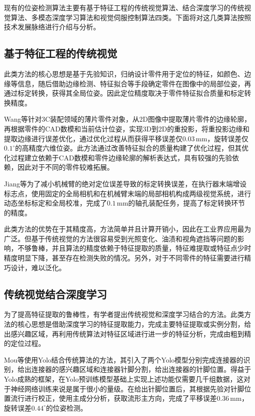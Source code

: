\documentclass{Diploma}
\begin{document}
现有的位姿检测算法主要有基于特征工程的传统视觉算法、结合深度学习的传统视觉算法、多模态深度学习算法和视觉伺服控制算法四类。下面将对这几类算法按照技术发展脉络进行介绍与分析。
\subsection{基于特征工程的传统视觉}
此类方法的核心思想是基于先验知识，归纳设计零件用于定位的特征，如颜色、边缘等信息，随后借助边缘检测、特征拟合等手段确定零件在图像中的局部位姿，再通过标定转换，获得其全局位姿。因此定位精度取决于零件特征拟合质量和标定转换精度。

Wang等针对3C装配领域的薄片零件对象，从2D图像中提取薄片零件的边缘轮廓，再根据零件的CAD数模和当前估计位姿，实现3D到2D的重投影，将重投影边缘和提取边缘进行误差优化，通过优化过程从而获得平移误差仅$0.03\,\mathrm{mm}$，旋转误差仅$0.1^{\circ}$的高精度六维位姿。此方法通过改善特征拟合的质量构建了优化过程，但其优化过程建立依赖于CAD数模和零件边缘轮廓的解析表达式，具有较强的先验依赖，因此对于不同的零件较难拓展\cite{wang2025high}。
%

Jiang等为了减小机械臂的绝对定位误差导致的标定转换误差，在执行器末端增设标志点，使用固定的全局相机和在机械臂末端的局部相机构成两级视觉系统，进行动态坐标标定和全局校准，完成了$0.1\,\mathrm{mm}$的轴孔装配任务，提高了标定转换环节的精度\cite{jiang2020measurement}。

此类方法的优势在于其精度高，方法简单并且计算开销小，因此在工业界应用最为广泛。但基于传统视觉的方法很容易受到光照变化、油渍和视角遮挡等问题的影响，不够鲁棒，并且算法的精度依赖于特征提取的质量，特征难提取或特征点少时精度明显下降，甚至存在检测失败的情况。另外，对于不同零件的特征需要进行精巧设计，难以泛化。
\subsection{传统视觉结合深度学习}
为了提高特征提取的鲁棒性，有学者提出传统视觉和深度学习结合的方法。此类方法的核心思想是借助深度学习的特征提取能力，完成主要特征提取或实例分割，给出感兴趣区域，再利用传统算法对特征区域进行进一步的特征分析，完成由粗到精的定位过程。

Mou等使用Yolo结合传统算法的方法，其引入了两个Yolo模型分别完成连接器的识别，给出连接器的感兴趣区域和连接器针脚分割，给出连接器的针脚位置。得益于Yolo成熟的框架，在Yolo预训练模型基础上实现上述功能仅需要几千组数据，这对于神经网络训练来说是属于很小的量级。在给出针脚位置后，其根据先验对针脚位置流行进行校正，使用主成分分析，获取流形主方向，完成了平移误差$0.36\,\mathrm{mm}$，旋转误差$0.44^{\circ}$的位姿检测\cite{fangli2022pose}。
%
\end{document}
